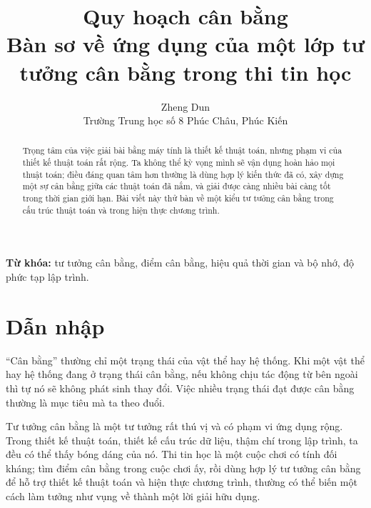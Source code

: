 \documentclass[11pt]{article}
\title{Quy hoạch cân bằng\\{\large Bàn sơ về ứng dụng của một lớp tư tưởng cân bằng trong thi tin học}}
\author{Zheng Dun\\Trường Trung học số 8 Phúc Châu, Phúc Kiến}
\date{}
\begin{document}
\maketitle


\renewcommand{\abstractname}{Tóm tắt}
\begin{abstract}
Trọng tâm của việc giải bài bằng máy tính là thiết kế thuật toán, nhưng phạm
vi của thiết kế thuật toán rất rộng. Ta không thể kỳ vọng mình sẽ vận dụng
hoàn hảo mọi thuật toán; điều đáng quan tâm hơn thường là dùng hợp lý kiến
thức đã có, xây dựng một sự cân bằng giữa các thuật toán đã nắm, và giải được
càng nhiều bài càng tốt trong thời gian giới hạn. Bài viết này thử bàn về
một kiểu tư tưởng cân bằng trong cấu trúc thuật toán và trong hiện thực
chương trình.
\end{abstract}

\noindent\textbf{Từ khóa:} tư tưởng cân bằng, điểm cân bằng, hiệu quả thời
gian và bộ nhớ, độ phức tạp lập trình.

\section{Dẫn nhập}

``Cân bằng'' thường chỉ một trạng thái của vật thể hay hệ thống. Khi một vật
thể hay hệ thống đang ở trạng thái cân bằng, nếu không chịu tác động từ bên
ngoài thì tự nó sẽ không phát sinh thay đổi. Việc nhiều trạng thái đạt được
cân bằng thường là mục tiêu mà ta theo đuổi.

Tư tưởng cân bằng là một tư tưởng rất thú vị và có phạm vi ứng dụng rộng.
Trong thiết kế thuật toán, thiết kế cấu trúc dữ liệu, thậm chí trong lập
trình, ta đều có thể thấy bóng dáng của nó. Thi tin học là một cuộc chơi có
tính đối kháng; tìm điểm cân bằng trong cuộc chơi ấy, rồi dùng hợp lý tư
tưởng cân bằng để hỗ trợ thiết kế thuật toán và hiện thực chương trình,
thường có thể biến một cách làm tưởng như vụng về thành một lời giải hữu
dụng.
\end{document}
